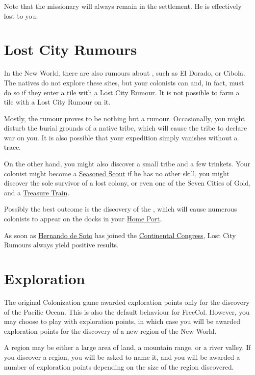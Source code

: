 \documentclass[12pt]{book}
\begin{document}
Note that the missionary will always remain in the settlement. He is
effectively lost to you.


\hypertarget{Lost City Rumours}{\section{Lost City Rumours}}

In the New World, there are also rumours about ,
such as El Dorado, or C{\'\i}bola. The natives do not explore these
sites, but your colonists can and, in fact, must do so if they enter a
tile with a Lost City Rumour. It is not possible to farm a tile with a
Lost City Rumour on it.

Mostly, the rumour proves to be nothing but a rumour. Occasionally,
you might disturb the burial grounds of a native tribe, which will
cause the tribe to declare war on you. It is also possible that your
expedition simply vanishes without a trace.

On the other hand, you might also discover a small tribe and a few
trinkets. Your colonist might become a \hyperlink{Seasoned
  Scout}{Seasoned Scout} if he has no other skill, you might discover
the sole survivor of a lost colony, or even one of the Seven Cities of
Gold, and a \hyperlink{Treasure Train}{Treasure Train}.

Possibly the best outcome is the discovery of the , which will cause numerous colonists to appear on the docks in
your \hyperlink{Home Port}{Home Port}.

As soon as \hyperlink{Hernando de Soto}{Hernando de Soto} has joined
the \hyperlink{Continental Congress}{Continental Congress}, Lost City
Rumours always yield positive results.


\hypertarget{Exploration}{\section{Exploration}}

The original Colonization game awarded exploration points only for the
discovery of the Pacific Ocean. This is also the default behaviour for
FreeCol. However, you may choose to play with exploration points, in
which case you will be awarded exploration points for the discovery of
a new region of the New World.

A region may be either a large area of land, a mountain range, or a
river valley. If you discover a region, you will be asked to name it,
and you will be awarded a number of exploration points depending on
the size of the region discovered.
\end{document}
